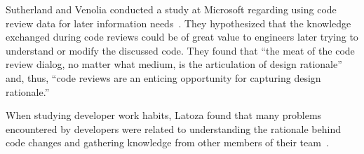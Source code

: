 Sutherland and Venolia conducted a study at Microsoft regarding using code
review data for later information needs~\cite{sutherland2009can}. They
hypothesized that the knowledge exchanged during code reviews could be of great
value to engineers later trying to understand or modify the discussed code.
They found that ``the meat of the code review dialog, no matter what medium, is
the articulation of design rationale'' and, thus, ``code reviews are an enticing
opportunity for capturing design rationale.''

When studying developer work habits, Latoza \etal found that many problems
encountered by developers were related to understanding the rationale behind
code changes and gathering knowledge from other members of their team~\cite{latoza2006maintaining}.